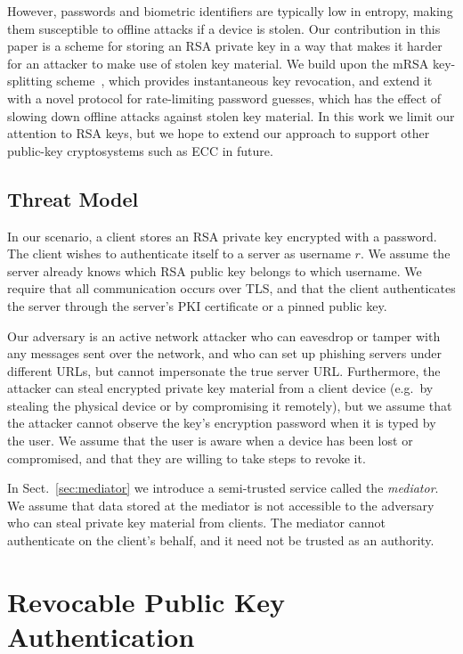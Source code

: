 \documentclass{llncs}
\begin{document}
However, passwords and biometric identifiers are typically low in entropy, making them susceptible
to offline attacks if a device is stolen. Our contribution in this paper is a scheme for storing an
RSA private key in a way that makes it harder for an attacker to make use of stolen key material. We
build upon the mRSA key-splitting scheme~\cite{Boneh01,Kutyiowski12}, which provides instantaneous
key revocation, and extend it with a novel protocol for rate-limiting password guesses, which has
the effect of slowing down offline attacks against stolen key material. In this work
we limit our attention to RSA keys, but we hope to extend our approach to support other public-key
cryptosystems such as ECC in future.

\subsection{Threat Model}\label{sec:threatmodel}

In our scenario, a client stores an RSA private key encrypted with a password. The client wishes to
authenticate itself to a server as username $r$. We assume the server already knows which RSA public
key belongs to which username. We require that all communication occurs over TLS, and that the
client authenticates the server through the server's PKI certificate or a pinned public key.

Our adversary is an active network attacker who can eavesdrop or tamper with any messages sent over
the network, and who can set up phishing servers under different URLs, but cannot impersonate the
true server URL. Furthermore, the attacker can steal encrypted private key material from a client
device (e.g.\ by stealing the physical device or by compromising it remotely), but we assume that
the attacker cannot observe the key's encryption password when it is typed by the user. We assume
that the user is aware when a device has been lost or compromised, and that they are willing to take
steps to revoke it.

In Sect.~\ref{sec:mediator} we introduce a semi-trusted service called the \emph{mediator}. We
assume that data stored at the mediator is not accessible to the adversary who can steal private key
material from clients. The mediator cannot authenticate on the client's behalf, and it need not be
trusted as an authority.

\section{Revocable Public Key Authentication}\label{sec:revocation}
\end{document}
